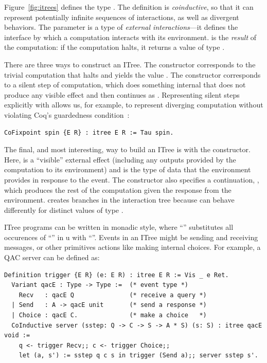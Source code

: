Figure~\ref{fig:itrees} defines the type .  The definition is
\textit{coinductive}, so that it can represent potentially infinite sequences of
interactions, as well as divergent behaviors.  The parameter  is a type
of \textit{external interactions}---it defines the interface by which a
computation interacts with its environment.   is the \textit{result} of
the computation: if the computation halts, it returns a value of type .

There are three ways to construct an ITree. The  constructor
corresponds to the trivial computation that halts and yields the value
. The  constructor corresponds to a silent step of
computation, which does something internal that does not produce any visible
effect and then continues as .  Representing silent steps explicitly with
 allows us, for example, to represent diverging computation without
violating Coq's guardedness condition~\cite{coinduction}:

\begin{lstlisting}[style=customcoq]
CoFixpoint spin {E R} : itree E R := Tau spin.
\end{lstlisting}

The final, and most interesting, way to build an ITree is with the  constructor.  Here,  is a ``visible'' external effect
(including any outputs provided by the computation to its environment) and
 is the type of data that the environment provides in response to the
event.  The constructor also specifies a continuation, , which produces
the rest of the computation given the response from the environment.  
creates branches in the interaction tree because  can behave differently
for distinct values of type .

ITree programs can be written in monadic style, where ``''
substitutes all occurences of ``'' in \ilc u with ``''.
Events in an ITree might be sending and receiving messages, or other primitives
actions like making internal choices.  For example, a QAC server can be defined
as:
\begin{lstlisting}[style=customcoq]
  Definition trigger {E R} (e: E R) : itree E R := Vis _ e Ret.
  Variant qacE : Type -> Type :=  (* event type *)
    Recv   : qacE Q               (* receive a query *)
  | Send   : A -> qacE unit       (* send a response *)
  | Choice : qacE C.              (* make a choice   *)
  CoInductive server (sstep: Q -> C -> S -> A * S) (s: S) : itree qacE void :=
    q <- trigger Recv;; c <- trigger Choice;;
    let (a, s') := sstep q c s in trigger (Send a);; server sstep s'.
\end{lstlisting}

